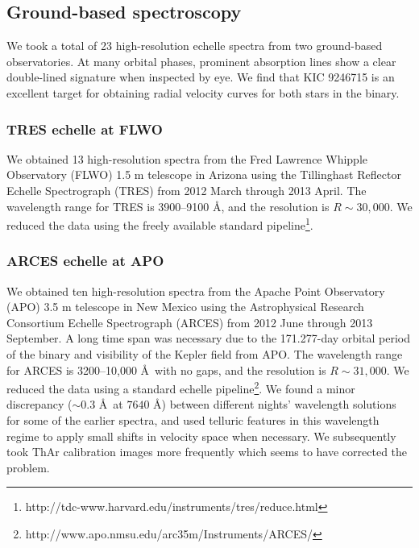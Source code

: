 \subsection{Ground-based spectroscopy}\label{spectra}
We took a total of 23 high-resolution echelle spectra from two ground-based observatories. At many orbital phases, prominent absorption lines show a clear double-lined signature when inspected by eye. We find that KIC 9246715 is an excellent target for obtaining radial velocity curves for both stars in the binary.

\subsubsection{TRES echelle at FLWO}\label{tres}
We obtained 13 high-resolution spectra from the Fred Lawrence Whipple Observatory (FLWO) 1.5 m telescope in Arizona using the Tillinghast Reflector Echelle Spectrograph (TRES) from 2012 March through 2013 April. The wavelength range for TRES is 3900--9100 \AA, and the resolution is $R \sim 30,000$. We reduced the data using the freely available standard pipeline\footnote{http://tdc-www.harvard.edu/instruments/tres/reduce.html}.

\subsubsection{ARCES echelle at APO}\label{arces}
We obtained ten high-resolution spectra from the Apache Point Observatory (APO) 3.5 m telescope in New Mexico using the Astrophysical Research Consortium Echelle Spectrograph (ARCES) from 2012 June through 2013 September. A long time span was necessary due to the 171.277-day orbital period of the binary and visibility of the Kepler field from APO. The wavelength range for ARCES is 3200--10,000 \AA \ with no gaps, and the resolution is $R \sim 31,000$. We reduced the data using a standard echelle pipeline\footnote{http://www.apo.nmsu.edu/arc35m/Instruments/ARCES/}. We found a minor discrepancy ($\sim 0.3$ \AA \ at $7640$ \AA) between different nights' wavelength solutions for some of the earlier spectra, and used telluric features in this wavelength regime to apply small shifts in velocity space when necessary. We subsequently took ThAr calibration images more frequently which seems to have corrected the problem.
